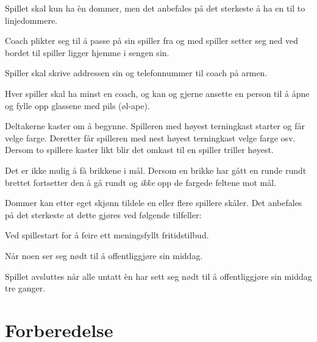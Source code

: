 \documentclass[10pt,a4paper,norsk,openany]{book}
\begin{document}
\begin{hus}
  \item \label{sec:hus} Spillet skal kun ha èn dommer, men det anbefales på det sterkeste å ha
    en til to linjedommere.

  \item Coach plikter seg til å passe på sin spiller fra og med spiller setter
    seg ned ved bordet til spiller ligger hjemme i sengen sin.

  \item Spiller skal skrive addressen sin og telefonnummer til coach på armen.

  \item \label{sec:hus-coach} Hver spiller skal ha minst en coach, og kan og
    gjerne ansette en person til å åpne og fylle opp glassene med pils (øl-ape).
    
  \item \label{par:hus-start} Deltakerne kaster om å begynne. Spilleren med høyest
    terningkast starter og får velge farge. Deretter får spilleren med nest
    høyest terningkast velge farge osv. Dersom to spillere kaster likt blir det
    omkast til en spiller triller høyest.
    
  \item \label{par:hus-hjem} Det er ikke mulig å få brikkene i mål. Dersom en
    brikke har gått en runde rundt brettet fortsetter den å gå rundt og
    \emph{ikke} opp de fargede feltene mot mål.
    
  \item Dommer kan etter eget skjønn tildele en eller flere spillere skåler. Det
    anbefales på det sterkeste at dette gjøres ved følgende tilfeller:
    
    \begin{hus}
    \item Ved spillestart for å feire ett meningsfyllt fritidstilbud.
      
      \item Når noen ser seg nødt til å offentliggjøre sin middag. 
      \end{hus}
      
  \item \label{par:hus-avsluttes} Spillet avsluttes når alle untatt èn har sett seg nødt til å
    offentliggjøre sin middag tre ganger.
\end{hus}


\chapter{Forberedelse}
\end{document}
